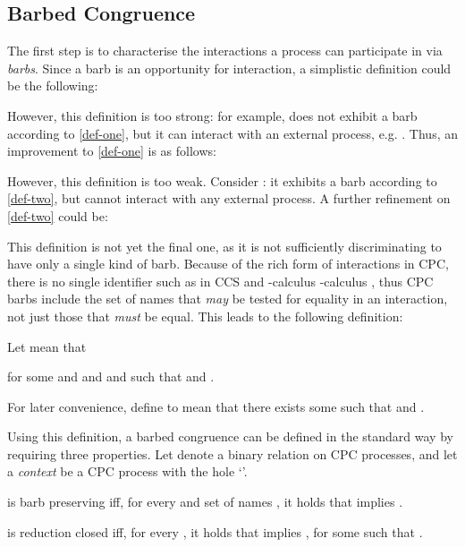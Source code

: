 \documentclass{LMCS}
\begin{document}
\subsection{Barbed Congruence}
The first  step is to characterise the interactions a process can participate in via
{\em barbs}. 
Since a barb is an opportunity for interaction, a simplistic
definition could be the following:

However, this definition is too strong: for example,  does not
exhibit a barb according to \eqref{def-one}, but it can interact with an external
process, e.g. .
Thus, an improvement to \eqref{def-one} is as follows:

However, this definition is too weak. Consider : it exhibits
a barb according to \eqref{def-two}, but cannot interact with any external
process.
A further refinement on \eqref{def-two} could be:

This definition is not yet the final one, as it is not sufficiently discriminating to have
only a single kind of barb.
Because of the rich form of interactions in CPC, there is no single identifier such as in CCS
and -calculus -calculus \cite{milner.sangiorgi:barbed-bisimulation},
thus CPC barbs include the set of names that {\em may} be tested for equality
in an interaction, not just those that {\em must} be equal. This leads to the following definition:

\begin{defi}[Barb]
\label{def:barb}
Let  mean that

for some  and  and  and  such that 
 and .
\end{defi}

For later convenience, define  to mean that there exists some 
such that  and .

Using this definition, a barbed congruence can be defined in the standard way
\cite{milner.sangiorgi:barbed-bisimulation,HY95} by requiring three properties.
Let  denote a binary relation on CPC processes, and let a {\em context}
 be a CPC process with the hole `'.

\begin{defi}
\label{def:barb-pres}
 is barb preserving iff, for every  and set of names  , it holds that 
implies .
\end{defi}

\begin{defi}
\label{def:barb-close}
 is reduction closed iff, for every , it holds that 
implies , for some  such that .
\end{defi}
\end{document}
